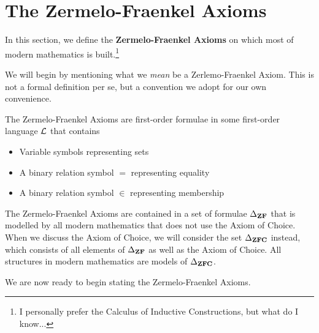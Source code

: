 \section{The Zermelo-Fraenkel Axioms}

In this section, we define the \textbf{Zermelo-Fraenkel Axioms} on which most of modern mathematics is built.\footnote{I personally prefer the Calculus of Inductive Constructions, but what do I know...}

We will begin by mentioning what we \textit{mean} be a Zerlemo-Fraenkel Axiom. This is not a formal definition per se, but a convention we adopt for our own convenience.

\begin{boxconvention}
    The Zermelo-Fraenkel Axioms are first-order formulae in some first-order language $\mathcal{L}$ that contains
    \begin{itemize}
        \item Variable symbols representing sets
        \item A binary relation symbol $=$ representing equality
        \item A binary relation symbol $\in$ representing membership
    \end{itemize}
    The Zermelo-Fraenkel Axioms are contained in a set of formulae $\Delta_{\mathbf{ZF}}$ that is modelled by all modern mathematics that does not use the Axiom of Choice. When we discuss the Axiom of Choice, we will consider the set $\Delta_{\mathbf{ZFC}}$ instead, which consists of all elements of $\Delta_{\mathbf{ZF}}$ as well as the Axiom of Choice. All structures in modern mathematics are models of $\Delta_{\mathbf{ZFC}}$.
\end{boxconvention}


We are now ready to begin stating the Zermelo-Fraenkel Axioms.

\begin{baxiom}
    \sorry
\end{baxiom}

\begin{baxiom}
    \sorry
\end{baxiom}

\begin{baxiom}
    \sorry
\end{baxiom}

